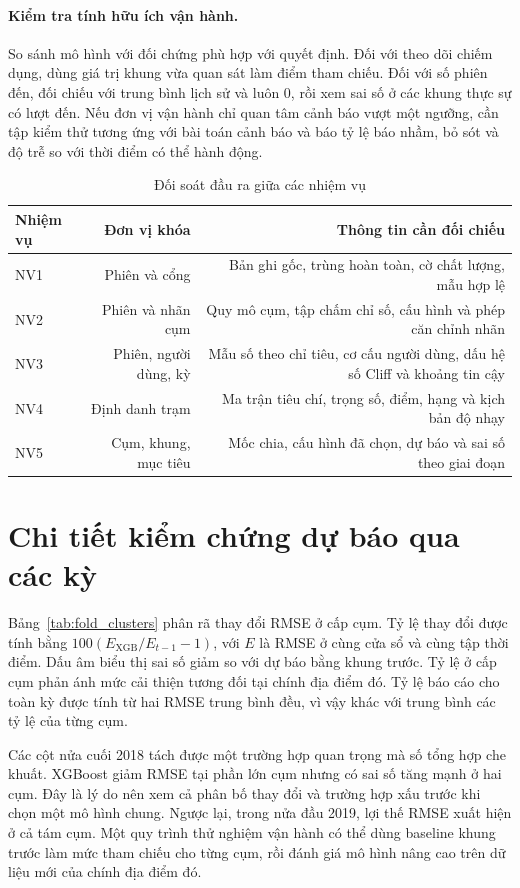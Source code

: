 \documentclass[conference,a4paper]{IEEEtran}
\begin{document}
\paragraph{Kiểm tra tính hữu ích vận hành.}
So sánh mô hình với đối chứng phù hợp với quyết định. Đối với theo dõi chiếm dụng, dùng giá trị khung vừa quan sát làm điểm tham chiếu. Đối với số phiên đến, đối chiếu với trung bình lịch sử và luôn 0, rồi xem sai số ở các khung thực sự có lượt đến. Nếu đơn vị vận hành chỉ quan tâm cảnh báo vượt một ngưỡng, cần tập kiểm thử tương ứng với bài toán cảnh báo và báo tỷ lệ báo nhầm, bỏ sót và độ trễ so với thời điểm có thể hành động.
\begin{table}[!t]
\caption{Đối soát đầu ra giữa các nhiệm vụ}
\label{tab:reproducibility}
\centering\footnotesize
\setlength{\tabcolsep}{3pt}
\begin{tabularx}{\textwidth}{@{}Xrr@{}}
\toprule
\textbf{Nhiệm vụ} & \textbf{Đơn vị khóa} & \textbf{Thông tin cần đối chiếu} \\
\midrule
NV1 & Phiên và cổng & Bản ghi gốc, trùng hoàn toàn, cờ chất lượng, mẫu hợp lệ \\
NV2 & Phiên và nhãn cụm & Quy mô cụm, tập chấm chỉ số, cấu hình và phép căn chỉnh nhãn \\
NV3 & Phiên, người dùng, kỳ & Mẫu số theo chỉ tiêu, cơ cấu người dùng, dấu hệ số Cliff và khoảng tin cậy \\
NV4 & Định danh trạm & Ma trận tiêu chí, trọng số, điểm, hạng và kịch bản độ nhạy \\
NV5 & Cụm, khung, mục tiêu & Mốc chia, cấu hình đã chọn, dự báo và sai số theo giai đoạn \\
\bottomrule
\end{tabularx}
\end{table}


\section{Chi tiết kiểm chứng dự báo qua các kỳ}
Bảng~\ref{tab:fold_clusters} phân rã thay đổi RMSE ở cấp cụm. Tỷ lệ thay đổi được tính bằng
$100(E_{\mathrm{XGB}}/E_{t-1}-1)$, với $E$ là RMSE ở cùng cửa sổ và cùng tập thời điểm. Dấu âm biểu thị sai số giảm so với dự báo bằng khung trước. Tỷ lệ ở cấp cụm phản ánh mức cải thiện tương đối tại chính địa điểm đó. Tỷ lệ báo cáo cho toàn kỳ được tính từ hai RMSE trung bình đều, vì vậy khác với trung bình các tỷ lệ của từng cụm.

Các cột nửa cuối 2018 tách được một trường hợp quan trọng mà số tổng hợp che khuất. XGBoost giảm RMSE tại phần lớn cụm nhưng có sai số tăng mạnh ở hai cụm. Đây là lý do nên xem cả phân bố thay đổi và trường hợp xấu trước khi chọn một mô hình chung. Ngược lại, trong nửa đầu 2019, lợi thế RMSE xuất hiện ở cả tám cụm. Một quy trình thử nghiệm vận hành có thể dùng baseline khung trước làm mức tham chiếu cho từng cụm, rồi đánh giá mô hình nâng cao trên dữ liệu mới của chính địa điểm đó.
\end{document}

